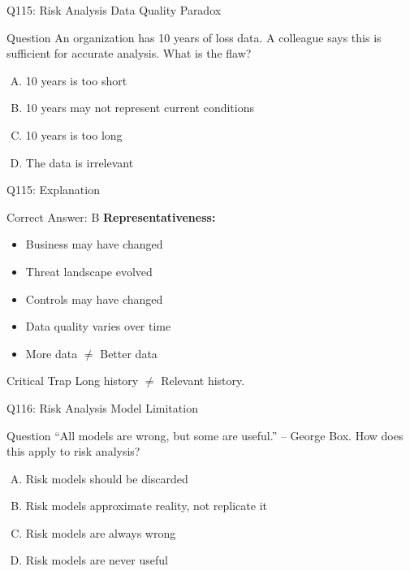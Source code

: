 \documentclass{beamer}
\begin{document}
	\begin{frame}{Q115: Risk Analysis Data Quality Paradox}
		\begin{block}{Question}
			An organization has 10 years of loss data. A colleague says this is sufficient for accurate analysis. What is the flaw?
		\end{block}
		\begin{enumerate}[(A)]
			\item 10 years is too short
			\item 10 years may not represent current conditions
			\item 10 years is too long
			\item The data is irrelevant
		\end{enumerate}
	\end{frame}
	
	\begin{frame}{Q115: Explanation}
		\begin{block}{Correct Answer: B}
			\textbf{Representativeness:}
			\begin{itemize}
				\item Business may have changed
				\item Threat landscape evolved
				\item Controls may have changed
				\item Data quality varies over time
				\item More data $\neq$ Better data
			\end{itemize}
		\end{block}
		\begin{alertblock}{Critical Trap}
			Long history $\neq$ Relevant history.
		\end{alertblock}
	\end{frame}
	
	\begin{frame}{Q116: Risk Analysis Model Limitation}
		\begin{block}{Question}
			``All models are wrong, but some are useful.'' -- George Box. How does this apply to risk analysis?
		\end{block}
		\begin{enumerate}[(A)]
			\item Risk models should be discarded
			\item Risk models approximate reality, not replicate it
			\item Risk models are always wrong
			\item Risk models are never useful
		\end{enumerate}
	\end{frame}
	
\end{document}
